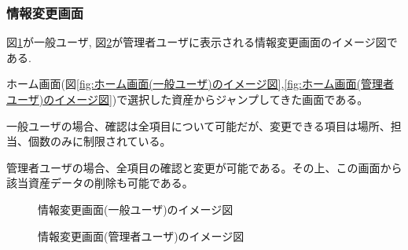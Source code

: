 \documentclass[11ptm]{jsarticle}
\begin{document}
\clearpage
\subsubsection{情報変更画面}
\label{sec:情報変更画面}
図\ref{fig:情報変更画面(一般ユーザ)のイメージ図}が一般ユーザ, 図\ref{fig:情報変更画面(管理者ユーザ)のイメージ図}が管理者ユーザに表示される情報変更画面のイメージ図である. \par
ホーム画面(図\ref{fig:ホーム画面(一般ユーザ)のイメージ図},\ref{fig:ホーム画面(管理者ユーザ)のイメージ図})で選択した資産からジャンプしてきた画面である。\par
一般ユーザの場合、確認は全項目について可能だが、変更できる項目は場所、担当、個数のみに制限されている。\par
管理者ユーザの場合、全項目の確認と変更が可能である。その上、この画面から該当資産データの削除も可能である。
\begin{figure}[h]
  \centering
  \caption{\label{fig:情報変更画面(一般ユーザ)のイメージ図}情報変更画面(一般ユーザ)のイメージ図}
\end{figure}
\begin{figure}[h]
  \centering
  \caption{\label{fig:情報変更画面(管理者ユーザ)のイメージ図}情報変更画面(管理者ユーザ)のイメージ図}
\end{figure}
\end{document}
